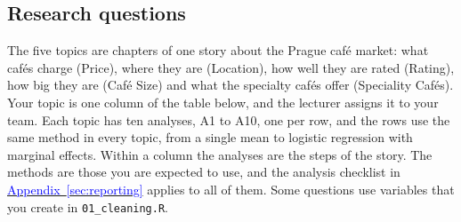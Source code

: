 \documentclass[11pt,a4paper]{article}
\begin{document}
\clearpage
\begin{landscape}
\newcommand{\AR}{Adjusted Rating\textsuperscript{*}}
\newcommand{\PL}{Price Level\textsuperscript{**}}
\section{Research questions}\label{sec:batches}

The five topics are chapters of one story about the Prague caf\'e market: what caf\'es charge (Price), where they are (Location), how well they are rated (Rating), how big they are (Caf\'e Size) and what the specialty caf\'es offer (Speciality Caf\'es). Your topic is one column of the table below, and the lecturer assigns it to your team. Each topic has ten analyses, A1 to A10, one per row, and the rows use the same method in every topic, from a single mean to logistic regression with marginal effects. Within a column the analyses are the steps of the story. The methods are those you are expected to use, and the analysis checklist in \hyperref[sec:reporting]{\textcolor{blue}{Appendix~\ref*{sec:reporting}}} applies to all of them. Some questions use variables that you create in \texttt{01\_cleaning.R}.


\end{landscape}
\end{document}
